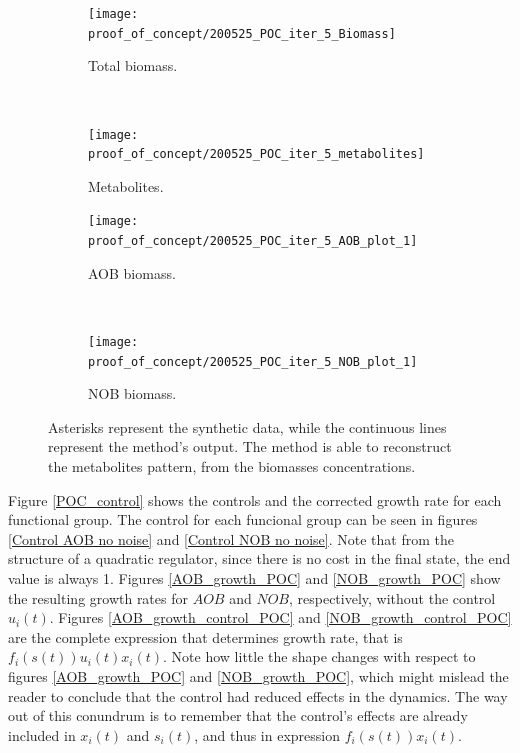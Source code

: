 \documentclass[3p,times]{article}
\begin{document}
\begin{figure}[h]
	\centering
	\begin{subfigure}{0.45 \linewidth}
	\texttt{[image: proof\_of\_concept/200525\_POC\_iter\_5\_Biomass]}
	\caption{Total biomass.}
	\label{PC_total_biomass}
	\end{subfigure}
~
	\begin{subfigure}{0.45 \linewidth}
		\texttt{[image: proof\_of\_concept/200525\_POC\_iter\_5\_metabolites]}
		\caption{Metabolites. }
		\label{PC_metabolites}
	\end{subfigure}

	\begin{subfigure}{0.45 \linewidth}
		\texttt{[image: proof\_of\_concept/200525\_POC\_iter\_5\_AOB\_plot\_1]}
		\caption{AOB biomass.}
		\label{PC_AOB}
	\end{subfigure}
	~
	\begin{subfigure}{0.45 \linewidth}
		\texttt{[image: proof\_of\_concept/200525\_POC\_iter\_5\_NOB\_plot\_1]}
		\caption{NOB biomass. }
		\label{PC_NOB}
	\end{subfigure}
\caption{Asterisks represent the synthetic data, while the continuous lines represent the method's output. The method is able to reconstruct the metabolites pattern, from the biomasses concentrations.}
\label{POC_tracking}
\end{figure}



Figure \ref{POC_control} shows the controls and the corrected growth rate for each functional group. The control for each funcional group can be seen in figures \ref{Control AOB no noise} and \eqref{Control NOB no noise}. Note that from the structure of a quadratic regulator, since there is no cost in the final state, the end value is always 1. Figures \ref{AOB_growth_POC} and \ref{NOB_growth_POC} show the resulting growth rates for $AOB$ and $NOB$, respectively, without the control $u_i(t)$. Figures \ref{AOB_growth_control_POC} and \ref{NOB_growth_control_POC} are the complete expression that determines growth rate, that is  $f_i(s(t))u_i(t)x_i(t)$. Note how little the shape changes with respect to figures \ref{AOB_growth_POC} and \ref{NOB_growth_POC}, which might mislead the reader to conclude that the control had reduced effects in the dynamics. The way out of this conundrum is to remember that the control's effects are already included in $x_i(t)$ and $s_i(t)$, and thus in expression $f_i(s(t))x_i(t)$. 
\end{document}

